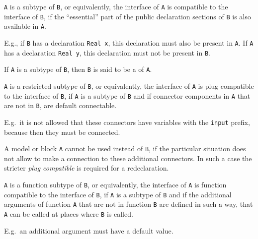 \begin{definition}
\lstinline!A! is a subtype of \lstinline!B!, or equivalently, the interface of \lstinline!A! is compatible to the interface of \lstinline!B!, if the ``essential'' part of the public declaration
sections of \lstinline!B! is also available in \lstinline!A!.
\par
\begin{nonnormative*}
E.g., if \lstinline!B! has a declaration \lstinline!Real x!, this declaration must also be present in \lstinline!A!.  If \lstinline!A! has a declaration \lstinline!Real y!, this declaration must
not be present in \lstinline!B!.
\end{nonnormative*}
\end{definition}

If \lstinline!A! is a subtype of \lstinline!B!, then \lstinline!B! is said to be a  of \lstinline!A!.

\begin{definition}
\lstinline!A! is a restricted subtype of \lstinline!B!, or equivalently, the interface of \lstinline!A! is plug compatible to the interface of \lstinline!B!, if \lstinline!A! is a subtype of
\lstinline!B! and if connector components in \lstinline!A! that are not in \lstinline!B!, are default connectable.
\begin{nonnormative}
E.g.\ it is not allowed that these connectors have variables with the \lstinline!input! prefix, because then they must be connected.
\end{nonnormative}
A model or block \lstinline!A! cannot be used instead of \lstinline!B!, if the particular situation does not allow to make a connection to these additional connectors. In such a case the stricter
\emph{plug compatible} is required for a redeclaration.
\end{definition}

\begin{definition}
\lstinline!A! is a function subtype of \lstinline!B!, or equivalently, the interface of \lstinline!A! is function compatible to the interface of \lstinline!B!, if \lstinline!A! is a subtype of
\lstinline!B! and if the additional arguments of function \lstinline!A! that are not in function \lstinline!B! are defined in such a way, that \lstinline!A! can be called at places where
\lstinline!B! is called.
\par
\begin{nonnormative*}
E.g.\ an additional argument must have a default value.
\end{nonnormative*}
\end{definition}

